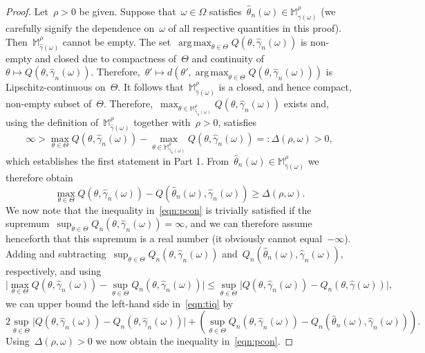 \documentclass[11pt, a4paper]{article}
\DeclareMathOperator*{\argmax}{arg\,max}
\theoremstyle{definition}
\begin{document}
\begin{proof}
Let~$\rho > 0$ be given. Suppose that~$\omega \in \Omega$ satisfies~$\hat{\theta}_n(\omega) \in \mathbb{M}_{\hat{\gamma}(\omega)}^{\rho}$ (we carefully signify the dependence on~$\omega$ of all respective quantities in this proof). Then~$\mathbb{M}_{\hat{\gamma}(\omega)}^{\rho}$ cannot be empty. The set~$\argmax_{\theta \in \Theta} Q(\theta, \hat{\gamma}_n(\omega))$ is non-empty and closed due to compactness of~$\Theta$ and continuity of~$\theta \mapsto Q(\theta, \hat{\gamma}_n(\omega))$. Therefore,~$\theta' \mapsto d(\theta', \argmax_{\theta \in \Theta} Q(\theta, \hat{\gamma}_n(\omega)))$ is Lipschitz-continuous on~$\Theta$. It follows that~$\mathbb{M}_{\hat{\gamma}(\omega)}^{\rho}$ is a closed, and hence compact, non-empty subset of~$\Theta$. Therefore,~$\max_{\theta \in \mathbb{M}_{\hat{\gamma}_n(\omega)}^{\rho}} Q(\theta, \hat{\gamma}_n(\omega))$ exists and, using the definition of~$\mathbb{M}_{\hat{\gamma}(\omega)}^{\rho}$ together with~$\rho > 0$, satisfies
%
\begin{equation*}
\infty > \max_{\theta \in \Theta} Q(\theta, \hat{\gamma}_n(\omega)) - \max_{\theta \in \mathbb{M}_{\hat{\gamma}_n(\omega)}^{\rho}} Q(\theta, \hat{\gamma}_n(\omega)) =: \Delta(\rho, \omega) > 0,
\end{equation*}
%
which establishes the first statement in Part 1. From~$\hat{\theta}_n(\omega) \in \mathbb{M}_{\hat{\gamma}(\omega)}^{\rho}$ we therefore obtain
%
\begin{equation}\label{eqn:tiq}
\max_{\theta \in \Theta} Q(\theta, \hat{\gamma}_n(\omega)) - Q(\hat{\theta}_n(\omega), \hat{\gamma}_n(\omega)) \geq \Delta(\rho, \omega).
\end{equation}
%
We now note that the inequality in~\eqref{eqn:pcon} is trivially satisfied if the supremum~$\sup_{\theta \in \Theta} Q_n(\theta, \hat{\gamma}_n(\omega)) = \infty$, and we can therefore assume henceforth that this supremum is a real number (it obviously cannot equal~$-\infty$). Adding and subtracting~$\sup_{\theta \in \Theta} Q_n(\theta, \hat{\gamma}_n(\omega))$ and~$Q_n(\hat{\theta}_n(\omega), \hat{\gamma}_n(\omega))$, respectively, and using~$$\big|\max_{\theta \in \Theta} Q(\theta, \hat{\gamma}_n(\omega)) - \sup_{\theta \in \Theta} Q_n(\theta, \hat{\gamma}_n(\omega))\big| \leq  \sup_{\theta \in \Theta} \big|Q(\theta, \hat{\gamma}_n(\omega)) - Q_n(\theta, \hat{\gamma}(\omega))\big|,$$ we can upper bound the left-hand side in~\eqref{eqn:tiq} by 
%
\begin{equation*}
2
\sup_{\theta \in \Theta} \big|Q(\theta, \hat{\gamma}_n(\omega)) - Q_n(\theta, \hat{\gamma}_n(\omega))\big| + \left(\sup_{\theta \in \Theta} Q_n(\theta, \hat{\gamma}_n(\omega)) - Q_n(\hat{\theta}_n(\omega), \hat{\gamma}_n(\omega)) \right).
\end{equation*}
%
Using~$\Delta(\rho, \omega) > 0$ we now obtain the inequality in~\eqref{eqn:pcon}.


\end{proof}
\end{document}
